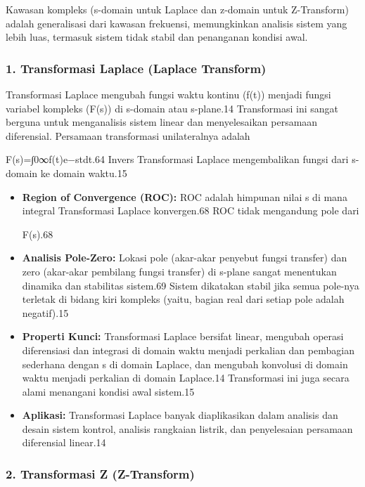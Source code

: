 \documentclass[
  letterpaper,
  DIV=11,
  numbers=noendperiod]{scrreprt}
\begin{document}
Kawasan kompleks (s-domain untuk Laplace dan z-domain untuk Z-Transform)
adalah generalisasi dari kawasan frekuensi, memungkinkan analisis sistem
yang lebih luas, termasuk sistem tidak stabil dan penanganan kondisi
awal.

\subsubsection{1. Transformasi Laplace (Laplace
Transform)}\label{transformasi-laplace-laplace-transform}

Transformasi Laplace mengubah fungsi waktu kontinu (f(t)) menjadi fungsi
variabel kompleks (F(s)) di s-domain atau s-plane.14 Transformasi ini
sangat berguna untuk menganalisis sistem linear dan menyelesaikan
persamaan diferensial. Persamaan transformasi unilateralnya adalah

F(s)=∫0∞\hspace{0pt}f(t)e−stdt.64 Invers Transformasi Laplace
mengembalikan fungsi dari s-domain ke domain waktu.15

\begin{itemize}
\item
  \textbf{Region of Convergence (ROC):} ROC adalah himpunan nilai s di
  mana integral Transformasi Laplace konvergen.68 ROC tidak mengandung
  pole dari

  F(s).68
\item
  \textbf{Analisis Pole-Zero:} Lokasi pole (akar-akar penyebut fungsi
  transfer) dan zero (akar-akar pembilang fungsi transfer) di s-plane
  sangat menentukan dinamika dan stabilitas sistem.69 Sistem dikatakan
  stabil jika semua pole-nya terletak di bidang kiri kompleks (yaitu,
  bagian real dari setiap pole adalah negatif).15
\item
  \textbf{Properti Kunci:} Transformasi Laplace bersifat linear,
  mengubah operasi diferensiasi dan integrasi di domain waktu menjadi
  perkalian dan pembagian sederhana dengan s di domain Laplace, dan
  mengubah konvolusi di domain waktu menjadi perkalian di domain
  Laplace.14 Transformasi ini juga secara alami menangani kondisi awal
  sistem.15
\item
  \textbf{Aplikasi:} Transformasi Laplace banyak diaplikasikan dalam
  analisis dan desain sistem kontrol, analisis rangkaian listrik, dan
  penyelesaian persamaan diferensial linear.14
\end{itemize}

\subsubsection{2. Transformasi Z
(Z-Transform)}\label{transformasi-z-z-transform}
\end{document}
